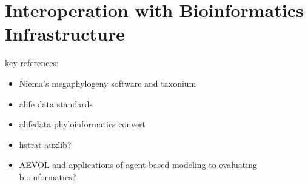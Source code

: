 \section{Interoperation with Bioinformatics Infrastructure}
\label{sec:interoperation}

key references:
\begin{itemize}
\item Niema's megaphylogeny software \citep{moshiri2025compacttree, moshiri2020treeswift} and taxonium \citep{sanderson2022taxonium}
\item alife data standards \citep{lalejini2019data}
\item alifedata phyloinformatics convert \citep{moreno2024mmore500}
\item hstrat auxlib? \citep{moreno2022hstrat}
\item AEVOL \citep{daudey2024aevol4b} and applications of agent-based modeling to evaluating bioinformatics?
\end{itemize}


